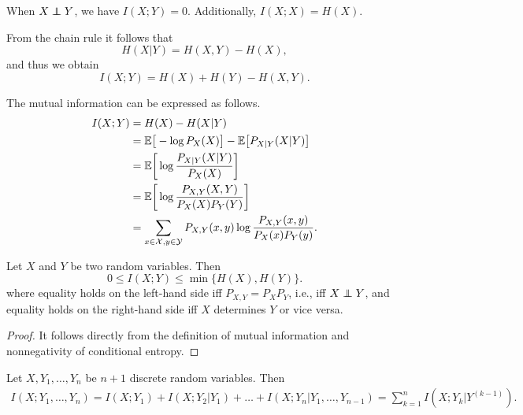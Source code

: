\documentclass[11pt,a4paper]{article}
\begin{document}
\begin{remark}
    When $X\perp\!\!\!\!\perp Y$, we have $I(X;Y) = 0$. Additionally, $I(X;X) = H(X)$.
\end{remark}

\begin{remark}
    From the chain rule it follows that 
    \begin{equation*}
        H(X|Y) = H(X,Y) - H(X),
    \end{equation*}
    and thus we obtain 
    \begin{equation*}
        I(X;Y) = H(X) + H(Y) - H(X,Y).
    \end{equation*}
\end{remark}

\begin{remark}\label{remark:mututal_information_as_relative_entropy}
    The mutual information can be expressed as follows.
    \begin{align*}
        I(X;Y) &= H(X) - H(X|Y) \\
        &= \mathbb{E}\big[-\log P_X(X)\big] - \mathbb{E}\big[ P_{X|Y}(X|Y) \big] \\
        &= \mathbb{E}\bigg[\log \dfrac{P_{X|Y}(X|Y)}{P_X(X)} \bigg] \\
        &= \mathbb{E}\bigg[\log \dfrac{P_{X,Y}(X,Y)}{P_X(X)P_Y(Y)} \bigg] \\
        &= \sum_{x\in\mathcal{X}, y\in\mathcal{Y}}P_{X,Y}(x,y) \log \dfrac{P_{X,Y}(x,y)}{P_X(x)P_Y(y)}. \\
    \end{align*}
\end{remark}

\begin{theorem}
    Let $X$ and $Y$ be two random variables. Then
    \begin{equation*}
        0\le I(X;Y) \le \min\{H(X),H(Y)\}.
    \end{equation*}
    where equality holds on the left-hand side iff $P_{X,Y} = P_XP_Y$, i.e.,  iff $X\perp\!\!\!\!\perp Y$, and equality holds on the right-hand side iff $X$ determines $Y$ or vice versa.
\end{theorem}

\begin{proof}
    It follows directly from the definition of mutual information and nonnegativity of conditional entropy.
\end{proof}

\begin{theorem}
    Let $X, Y_1,\ldots,Y_n$ be $n+1$ discrete random variables. Then 
    \begin{align*}
        I(X; Y_1,\ldots,Y_n) = I(X; Y_1) + I(X; Y_2|Y_1) + \ldots + I(X; Y_n | Y_1,\ldots,Y_{n-1})= \sum_{k=1}^n I(X; Y_k|Y^{(k-1)}).
    \end{align*}
\end{theorem}
\end{document}
